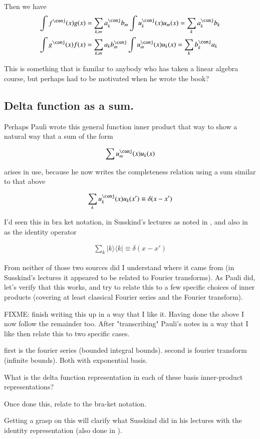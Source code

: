 \documentclass{article}
\newcommand{\ket}[1]{\lvert {#1} \rangle}
\newcommand{\bra}[1]{\langle {#1} \rvert}
\newcommand{\ketbra}[2]{\ket{#1}\bra{#2}}
\begin{document}
Then we have 
\begin{align*}
\int f^\conj(x) g(x) &= \sum_{k,m} a_k^\conj b_m \int u_k^\conj(x) u_m(x) = \sum_k a_k^\conj b_k \\
\int g^\conj(x) f(x) &= \sum_{k,m} a_k b_m^\conj \int u_m^\conj(x) u_k(x) = \sum_k b_k^\conj a_k \\
\end{align*}

This is something that is familar to anybody who has taken a linear
algebra course, but perhaps had to be motivated when he wrote the book?

\subsection{ Delta function as a sum. }

Perhaps Pauli wrote this general function inner product that way to show a natural way that a sum of the
form

\begin{align*}
\sum u_m^\conj(x) u_k(x)
\end{align*}

arises in use, because he now writes the completeness relation using a sum similar to that above

\begin{align}
\sum_{k} u_k^\conj(x) u_k(x') \equiv \delta(x-x') 
\end{align}

I'd seen this in bra ket notation, in Susskind's lectures as noted in \cite{PJQmSusskind}, and also in \cite{mcmahon2005qmd} as the
identity operator

\begin{align}
\sum_{k} \ketbra{k}{k} \equiv \delta(x-x') 
\end{align}

From neither of those two sources did I understand where it came from (in Susskind's lectures it appeared to be
related to Fourier transforms).
As Pauli did, let's verify that this works, and try to relate this to a few specific choices of inner products (covering at
least classical Fourier series and the Fourier transform).

FIXME: finish writing this up in a way that I like it.  Having done the above I now follow the remainder too.  After "transcribing" Pauli's
notes in a way that I like then relate this to two specific cases.

first is the fourier series (bounded integral bounds).  second is fourier transform (infinite bounds).  Both with exponential basis.

What is the delta function representation in each of these basis inner-product representations?

Once done this, relate to the bra-ket notation.

Getting a grasp on this will clarify what Susskind did in his lectures with the identity representation (also done in \cite{mcmahon2005qmd}).



\end{document}
